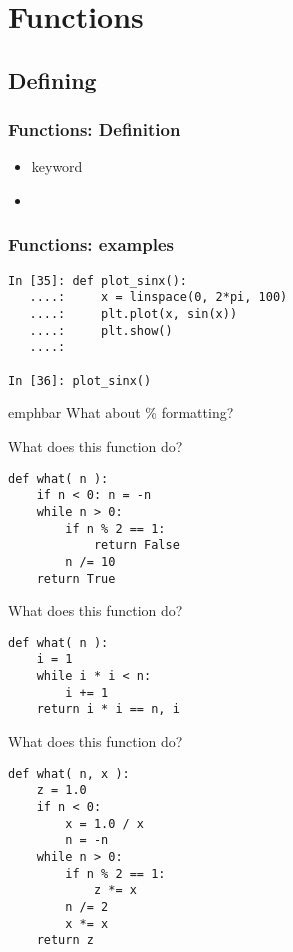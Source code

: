 \documentclass[14pt,compress]{beamer}
\newcommand{\emphbar}[1]
{\begin{beamercolorbox}[rounded=true]{emphbar} 
      {#1}
 \end{beamercolorbox}
}
\newcommand{\kwrd}[1]{ \texttt{\textbf{\color{blue}{#1}}}  }
\begin{document}

\section{Functions}
\subsection{Defining}
\begin{frame}[fragile]
\frametitle{Functions: Definition}
\begin{itemize}
  \item \kwrd{def} keyword
  \item 
\end{itemize}
\end{frame}

\begin{frame}[fragile]
  \frametitle{Functions: examples}
  \begin{lstlisting}
In [35]: def plot_sinx():
   ....:     x = linspace(0, 2*pi, 100)
   ....:     plt.plot(x, sin(x))
   ....:     plt.show()
   ....:    

In [36]: plot_sinx()
  \end{lstlisting}
\pause
\emphbar{What about \% formatting?}
\end{frame}

\begin{frame}[fragile]
  {What does this function do?}
  \begin{lstlisting}
def what( n ):
    if n < 0: n = -n
    while n > 0:
        if n % 2 == 1:
            return False
        n /= 10
    return True
  \end{lstlisting}
\end{frame}

\begin{frame}[fragile]
  {What does this function do?}
\begin{lstlisting}
def what( n ):
    i = 1    
    while i * i < n:
        i += 1
    return i * i == n, i
  \end{lstlisting}
\end{frame}

\begin{frame}[fragile]
  {What does this function do?}
  \begin{lstlisting}
def what( n, x ):
    z = 1.0
    if n < 0:
        x = 1.0 / x
        n = -n
    while n > 0:
        if n % 2 == 1:
            z *= x
        n /= 2
        x *= x
    return z
  \end{lstlisting}
\end{frame}
\end{document}
